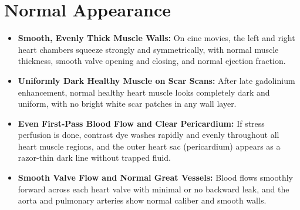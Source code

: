 \section{Normal Appearance}
\begin{itemize}
\item \textbf{Smooth, Evenly Thick Muscle Walls:} On cine movies, the left and right heart chambers squeeze strongly and symmetrically, with normal muscle thickness, smooth valve opening and closing, and normal ejection fraction.
\item \textbf{Uniformly Dark Healthy Muscle on Scar Scans:} After late gadolinium enhancement, normal healthy heart muscle looks completely dark and uniform, with no bright white scar patches in any wall layer.
\item \textbf{Even First-Pass Blood Flow and Clear Pericardium:} If stress perfusion is done, contrast dye washes rapidly and evenly throughout all heart muscle regions, and the outer heart sac (pericardium) appears as a razor-thin dark line without trapped fluid.
\item \textbf{Smooth Valve Flow and Normal Great Vessels:} Blood flows smoothly forward across each heart valve with minimal or no backward leak, and the aorta and pulmonary arteries show normal caliber and smooth walls.
\end{itemize}

